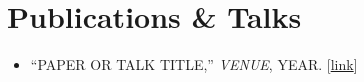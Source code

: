 \documentclass[10pt, letterpaper]{article}
\begin{document}

\section{Publications \& Talks}

\begin{itemize}
  \item ``PAPER OR TALK TITLE,'' \textit{VENUE}, YEAR.
    [\href{URL}{link}]
\end{itemize}


\end{document}
